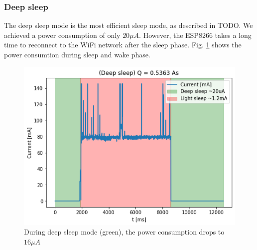 \subsubsection{Deep sleep}
The deep sleep mode is the most efficient sleep mode, as described in TODO. 
We achieved a power consumption of only $20 \mu A$. 
However, the ESP8266 takes a long time to reconnect to the WiFi network after the sleep phase.
Fig. \ref{fig:deep_sleep} shows the power consumtion during sleep and wake phase.
\begin{figure}[h]
    \includegraphics[width = \linewidth]{fig/deep_sleep.png}
    \caption{During deep sleep mode (green), the power consumption drops to $16 \mu A$}
    \label{fig:deep_sleep}
\end{figure}